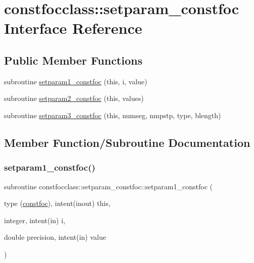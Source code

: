 \hypertarget{interfaceconstfocclass_1_1setparam__constfoc}{}\section{constfocclass\+::setparam\+\_\+constfoc Interface Reference}
\label{interfaceconstfocclass_1_1setparam__constfoc}
\subsection*{Public Member Functions}
\begin{DoxyCompactItemize}
\item 
subroutine \mbox{\hyperlink{interfaceconstfocclass_1_1setparam__constfoc_a73531e0913c6630839a4b0203760dc81}{setparam1\+\_\+constfoc}} (this, i, value)
\item 
subroutine \mbox{\hyperlink{interfaceconstfocclass_1_1setparam__constfoc_a57f09eab1784b8992915b3b7904904cf}{setparam2\+\_\+constfoc}} (this, values)
\item 
subroutine \mbox{\hyperlink{interfaceconstfocclass_1_1setparam__constfoc_a50c4bf308adab60563a469f3517a5b96}{setparam3\+\_\+constfoc}} (this, numseg, nmpstp, type, blength)
\end{DoxyCompactItemize}


\subsection{Member Function/\+Subroutine Documentation}
\mbox{\label{interfaceconstfocclass_1_1setparam__constfoc_a73531e0913c6630839a4b0203760dc81}} 
\subsubsection{\texorpdfstring{setparam1\_constfoc()}{setparam1\_constfoc()}}
{\footnotesize\ttfamily subroutine constfocclass\+::setparam\+\_\+constfoc\+::setparam1\+\_\+constfoc (\begin{DoxyParamCaption}\item[{type (\mbox{\hyperlink{namespaceconstfocclass_structconstfocclass_1_1constfoc}{constfoc}}), intent(inout)}]{this,  }\item[{integer, intent(in)}]{i,  }\item[{double precision, intent(in)}]{value }\end{DoxyParamCaption})}

